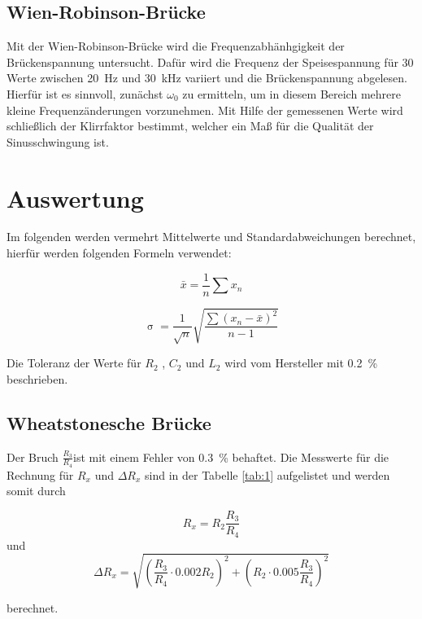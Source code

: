 \subsection{Wien-Robinson-Brücke}
Mit der Wien-Robinson-Brücke wird die Frequenzabhänhgigkeit der Brückenspannung untersucht.
Dafür wird die Frequenz der Speisespannung für 30 Werte zwischen \SI{20}{\Hz} und \SI{30}{\kilo\Hz}
variiert und die Brückenspannung abgelesen. Hierfür ist es sinnvoll, zunächst $\omega_0$ zu
ermitteln, um in diesem Bereich mehrere kleine Frequenzänderungen vorzunehmen.
Mit Hilfe der gemessenen Werte wird schließlich der Klirrfaktor bestimmt, welcher ein Maß für
die Qualität der Sinusschwingung ist.


\section{Auswertung}
Im folgenden werden vermehrt Mittelwerte und Standardabweichungen berechnet, hierfür werden folgenden Formeln verwendet:

\begin{equation}
  \bar{x} = \frac{1}{n} \sum{x_n}
  \label{Mittelwert}
\end{equation}

\begin{equation}
\upsigma = \frac{1}{\sqrt{n}} \sqrt{\frac{\sum{(x_n - \bar{x})^2}}{n-1} }
\label{Standardabweichung}
\end{equation}

Die Toleranz der Werte für $R_2$ , $C_2$ und $L_2$ wird vom Hersteller mit \SI{0.2}{\%} beschrieben.
\subsection{Wheatstonesche Brücke}
Der Bruch $\frac{R_3}{R_4} $ist mit einem Fehler von \SI{0.3}{\%} behaftet.
Die Messwerte für die Rechnung für $R_x$ und $\Delta R_x$ sind in der Tabelle \ref{tab:1} aufgelistet und werden somit durch

\begin{equation}
  \label{Widerstand}
  R_x = R_2 \frac{R_3}{R_4}
\end{equation}
und
\begin{equation}
  \label{FehlerWiderstand}
  \Delta R_x = \sqrt{\left(\frac{R_3}{R_4} \cdot 0.002 R_2\right)^2 + \left(R_2 \cdot 0.005 \frac{R_3}{R_4}\right)^2}
\end{equation}

berechnet.

